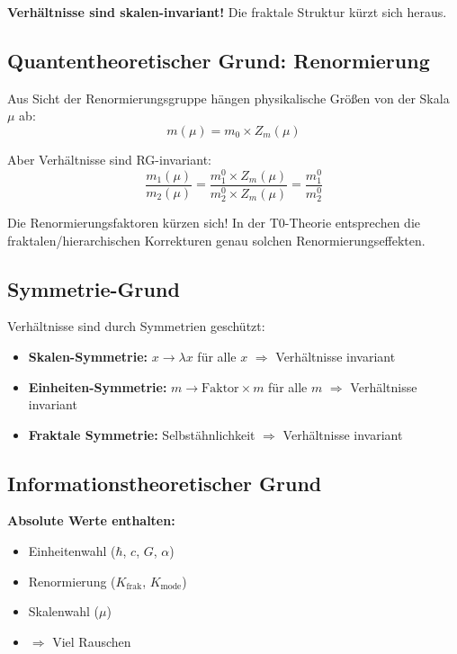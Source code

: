 \textbf{Verhältnisse sind skalen-invariant!} Die fraktale Struktur kürzt sich heraus.

\subsection{Quantentheoretischer Grund: Renormierung}

Aus Sicht der Renormierungsgruppe hängen physikalische Größen von der Skala $\mu$ ab:
\begin{equation}
	m(\mu) = m_0 \times Z_m(\mu)
\end{equation}

Aber Verhältnisse sind RG-invariant:
\begin{equation}
	\frac{m_1(\mu)}{m_2(\mu)} = \frac{m_1^0 \times Z_m(\mu)}{m_2^0 \times Z_m(\mu)} = \frac{m_1^0}{m_2^0}
\end{equation}

Die Renormierungsfaktoren kürzen sich! In der T0-Theorie entsprechen die fraktalen/hierarchischen Korrekturen genau solchen Renormierungseffekten.

\subsection{Symmetrie-Grund}

Verhältnisse sind durch Symmetrien geschützt:

\begin{itemize}[nosep]
	\item \textbf{Skalen-Symmetrie:} $x \to \lambda x$ für alle $x$ $\Rightarrow$ Verhältnisse invariant
	\item \textbf{Einheiten-Symmetrie:} $m \to \text{Faktor} \times m$ für alle $m$ $\Rightarrow$ Verhältnisse invariant
	\item \textbf{Fraktale Symmetrie:} Selbstähnlichkeit $\Rightarrow$ Verhältnisse invariant
\end{itemize}

\subsection{Informationstheoretischer Grund}

\textbf{Absolute Werte enthalten:}
\begin{itemize}[nosep]
	\item Einheitenwahl ($\hbar$, $c$, $G$, $\alpha$)
	\item Renormierung ($K_\text{frak}$, $K_\text{mode}$)
	\item Skalenwahl ($\mu$)
	\item $\Rightarrow$ Viel Rauschen
\end{itemize}

